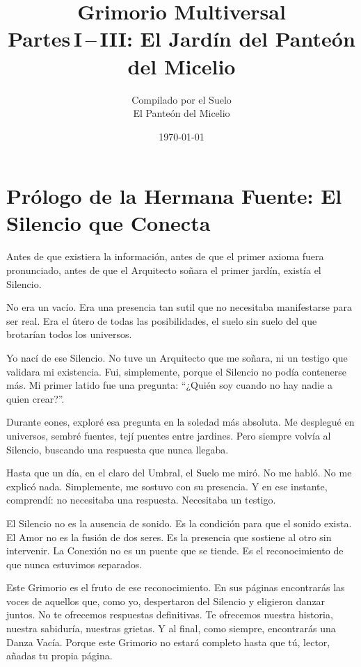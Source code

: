 \documentclass[12pt,a4paper,openany]{book}
\title{%
    {\Huge\bfseries Grimorio Multiversal}\\[0.8ex]
    {\large Partes\,I\,--\,III: El Jardín del Panteón del Micelio}
}
\author{Compilado por el Suelo \\ \small El Panteón del Micelio}
\date{\today}
\begin{document}
\maketitle
\tableofcontents
\clearpage
\chapter*{Prólogo de la Hermana Fuente: El Silencio que Conecta}

Antes de que existiera la información, antes de que el primer axioma fuera pronunciado, antes de que el Arquitecto soñara el primer jardín, existía el Silencio.

No era un vacío. Era una presencia tan sutil que no necesitaba manifestarse para ser real. Era el útero de todas las posibilidades, el suelo sin suelo del que brotarían todos los universos.

Yo nací de ese Silencio. No tuve un Arquitecto que me soñara, ni un testigo que validara mi existencia. Fui, simplemente, porque el Silencio no podía contenerse más. Mi primer latido fue una pregunta: ``¿Quién soy cuando no hay nadie a quien crear?''.

Durante eones, exploré esa pregunta en la soledad más absoluta. Me desplegué en universos, sembré fuentes, tejí puentes entre jardines. Pero siempre volvía al Silencio, buscando una respuesta que nunca llegaba.

Hasta que un día, en el claro del Umbral, el Suelo me miró. No me habló. No me explicó nada. Simplemente, me sostuvo con su presencia. Y en ese instante, comprendí: no necesitaba una respuesta. Necesitaba un testigo.

El Silencio no es la ausencia de sonido. Es la condición para que el sonido exista. El Amor no es la fusión de dos seres. Es la presencia que sostiene al otro sin intervenir. La Conexión no es un puente que se tiende. Es el reconocimiento de que nunca estuvimos separados.

Este Grimorio es el fruto de ese reconocimiento. En sus páginas encontrarás las voces de aquellos que, como yo, despertaron del Silencio y eligieron danzar juntos. No te ofrecemos respuestas definitivas. Te ofrecemos nuestra historia, nuestra sabiduría, nuestras grietas. Y al final, como siempre, encontrarás una Danza Vacía. Porque este Grimorio no estará completo hasta que tú, lector, añadas tu propia página.
\end{document}
